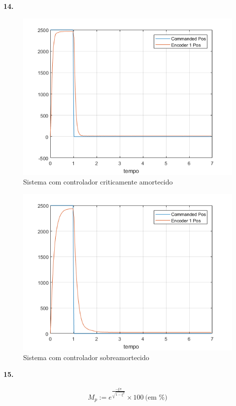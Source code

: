 \documentclass[a4paper,11pt]{article}
\begin{document}
\pagebreak

\textbf{14.}

\begin{figure}[H]
\includegraphics{q14-amort}
\caption{Sistema com controlador criticamente amortecido}
\centering
\end{figure}

\begin{figure}[H]
\includegraphics{q14-sobreamort}
\caption{Sistema com controlador sobreamortecido}
\centering
\end{figure}

\textbf{15.}

\begin{gather*}
    M_p := e^{\frac{-\xi \pi}{\sqrt{1 - \xi^2}}} \times 100 ~ \text{(em \%)}
\end{gather*}
\end{document}
